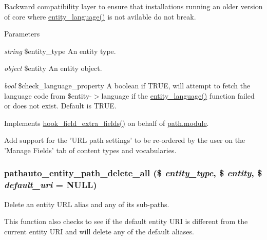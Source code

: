 Backward compatibility layer to ensure that installations running an older version of core where \hyperlink{common_8inc_abd1bd4466071377d474040174c49f06b}{entity\_\-language()} is not avilable do not break.


\begin{DoxyParams}{Parameters}
\item[{\em string}]\$entity\_\-type An entity type. \item[{\em object}]\$entity An entity object. \item[{\em bool}]\$check\_\-language\_\-property A boolean if TRUE, will attempt to fetch the language code from \$entity-\/$>$language if the \hyperlink{common_8inc_abd1bd4466071377d474040174c49f06b}{entity\_\-language()} function failed or does not exist. Default is TRUE. \end{DoxyParams}


Implements \hyperlink{group__hooks_ga7100332aa5b4d5f6ba72534599d133e5}{hook\_\-field\_\-extra\_\-fields()} on behalf of \hyperlink{path_8module}{path.module}.

Add support for the 'URL path settings' to be re-\/ordered by the user on the 'Manage Fields' tab of content types and vocabularies.\hypertarget{pathauto_8module_a3bc05a506e9cefc24923f10ae3069c79}{
\subsubsection[{pathauto\_\-entity\_\-path\_\-delete\_\-all}]{\setlength{\rightskip}{0pt plus 5cm}pathauto\_\-entity\_\-path\_\-delete\_\-all (\$ {\em entity\_\-type}, \/  \$ {\em entity}, \/  \$ {\em default\_\-uri} = {\ttfamily NULL})}}
\label{pathauto_8module_a3bc05a506e9cefc24923f10ae3069c79}
Delete an entity URL alias and any of its sub-\/paths.

This function also checks to see if the default entity URI is different from the current entity URI and will delete any of the default aliases.



